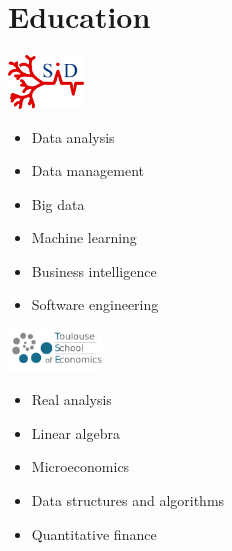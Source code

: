 \section{Education}

\noindent
\begin{minipage}{.15\textwidth}
\centerline{\includegraphics[width=20mm]{img/sid}}
\end{minipage}%
\hspace{5mm}
\begin{minipage}{.7\textwidth}
\raggedright
    \begin{itemize}
        \item Data analysis
        \item Data management
        \item Big data
        \item Machine learning
        \item Business intelligence
        \item Software engineering
    \end{itemize}
\end{minipage}

\noindent
\begin{minipage}{.15\textwidth}
\centerline{\includegraphics[width=25mm]{img/tse}}
\end{minipage}%
\hspace{5mm}
\begin{minipage}{.7\textwidth}
\raggedright
    \begin{itemize}
        \item Real analysis
        \item Linear algebra
        \item Microeconomics
        \item Data structures and algorithms
        \item Quantitative finance
    \end{itemize}
\end{minipage}

